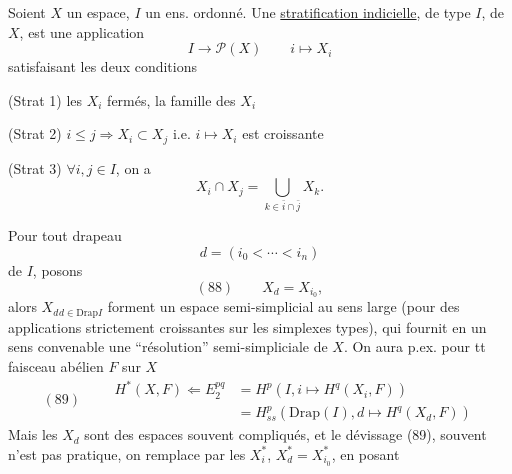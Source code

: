 
Soient $X$ un espace, $I$ un ens. ordonné.
Une \uline{stratification indicielle}, de type $I$, de $X$, est une application
\[I\longrightarrow\mathcal P(X)\qquad i\longmapsto X_i\]
satisfaisant les deux conditions

(Strat 1) les $X_i$ fermés, la famille des $X_i$  \uline{ }

(Strat 2) $i\leq j\Longrightarrow X_i\subset X_j$ i.e. $i\mapsto X_i$ est croissante

(Strat 3) $\forall i,j\in I$, on a
\[X_i\cap X_j=\bigcup_{k\in\bar i\cap\bar j}X_k.\]

Pour tout drapeau
\[d=(i_0<\cdots<i_n)\]
de $I$, posons
\[(88)\qquad X_d=X_{i_0},\]
alors  $X_d{}_{d\in\mathrm{Drap}I}$ forment un  espace semi-simplicial  au sens large (pour des applications strictement croissantes sur les simplexes types), qui fournit en un sens convenable une ``résolution'' semi-simpliciale de $X$. On aura p.ex. pour tt faisceau abélien $F$ sur $X$
\[
(89)\qquad\begin{aligned}
H^*(X,F)\Longleftarrow E_2^{pq}&=H^p(I,i\mapsto H^q(X_i,F))\\
&=H^p_{ss}(\mathrm{Drap}(I),d\mapsto H^q(X_d,F))
\end{aligned}
\]
Mais les  $X_d$ sont des espaces souvent compliqués, et le dévissage (89), souvent n'est pas pratique, on remplace par les $X_i^*$, $X_d^*=X_{i_0}^*$, en posant
